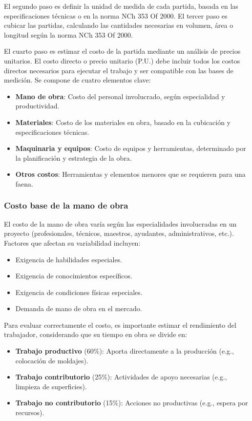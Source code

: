 El segundo paso es definir la unidad de medida de cada partida, basada en las especificaciones técnicas o en la norma NCh 353 Of 2000. El tercer paso es cubicar las partidas, calculando las cantidades necesarias en volumen, área o longitud según la norma NCh 353 Of 2000.

El cuarto paso es estimar el costo de la partida mediante un análisis de precios unitarios. El costo directo o precio unitario (P.U.) debe incluir todos los costos directos necesarios para ejecutar el trabajo y ser compatible con las bases de medición. Se compone de cuatro elementos clave:

\begin{itemize}
    \item \textbf{Mano de obra}: Costo del personal involucrado, según especialidad y productividad.
    \item \textbf{Materiales}: Costo de los materiales en obra, basado en la cubicación y especificaciones técnicas.
    \item \textbf{Maquinaria y equipos}: Costo de equipos y herramientas, determinado por la planificación y estrategia de la obra.
    \item \textbf{Otros costos}: Herramientas y elementos menores que se requieren para una faena.
\end{itemize}

\subsubsection{Costo base de la mano de obra}

El costo de la mano de obra varía según las especialidades involucradas en un proyecto (profesionales, técnicos, maestros, ayudantes, administrativos, etc.). Factores que afectan su variabilidad incluyen:

\begin{itemize}
    \item Exigencia de habilidades especiales.
    \item Exigencia de conocimientos específicos.
    \item Exigencia de condiciones físicas especiales.
    \item Demanda de mano de obra en el mercado.
\end{itemize}

Para evaluar correctamente el costo, es importante estimar el rendimiento del trabajador, considerando que su tiempo en obra se divide en:

\begin{itemize}
    \item \textbf{Trabajo productivo} (60\%): Aporta directamente a la producción (e.g., colocación de moldajes).
    \item \textbf{Trabajo contributorio} (25\%): Actividades de apoyo necesarias (e.g., limpieza de superficies).
    \item \textbf{Trabajo no contributorio} (15\%): Acciones no productivas (e.g., espera por recursos).
\end{itemize}

